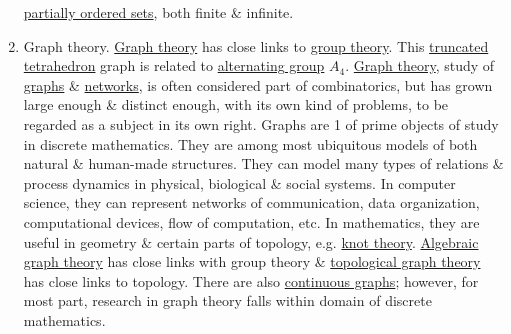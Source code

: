 \documentclass{article}
\begin{document}
\begin{enumerate}
\href{https://en.wikipedia.org/wiki/Partially_ordered_sets}{partially ordered sets}, both finite \& infinite.
	\item {\sf Graph theory.} {\sf\href{https://en.wikipedia.org/wiki/Graph_theory}{Graph theory} has close links to \href{https://en.wikipedia.org/wiki/Group_theory}{group theory}. This \href{https://en.wikipedia.org/wiki/Truncated_tetrahedron}{truncated tetrahedron} graph is related to \href{https://en.wikipedia.org/wiki/Alternating_group}{alternating group} $A_4$.} \href{https://en.wikipedia.org/wiki/Graph_theory}{Graph theory}, study of \href{https://en.wikipedia.org/wiki/Graph_(discrete_mathematics)}{graphs} \& \href{https://en.wikipedia.org/wiki/Network_theory}{networks}, is often considered part of combinatorics, but has grown large enough \& distinct enough, with its own kind of problems, to be regarded as a subject in its own right. Graphs are 1 of prime objects of study in discrete mathematics. They are among most ubiquitous models of both natural \& human-made structures. They can model many types of relations \& process dynamics in physical, biological \& social systems. In computer science, they can represent networks of communication, data organization, computational devices, flow of computation, etc. In mathematics, they are useful in geometry \& certain parts of topology, e.g. \href{https://en.wikipedia.org/wiki/Knot_theory}{knot theory}. \href{https://en.wikipedia.org/wiki/Algebraic_graph_theory}{Algebraic graph theory} has close links with group theory \& \href{https://en.wikipedia.org/wiki/Topological_graph_theory}{topological graph theory} has close links to topology. There are also \href{https://en.wikipedia.org/wiki/Continuous_graph}{continuous graphs}; however, for most part, research in graph theory falls within domain of discrete mathematics.

\end{enumerate}
\end{document}
